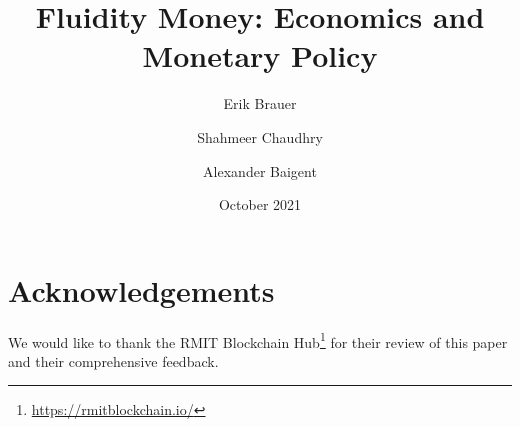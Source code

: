 \documentclass{article}
\title{\vspace{-1.0cm}Fluidity Money: Economics and Monetary Policy}
\author[]{Erik Brauer}
\author[]{Shahmeer Chaudhry}
\author[]{Alexander Baigent}
\affil[]{Fluidity Money}
\date{October 2021}
\theoremstyle{definition}
\begin{document}
\maketitle





\newpage



\newpage



\newpage



\newpage



\newpage



\newpage

\section*{Acknowledgements}

We would like to thank the RMIT Blockchain Hub\footnote{\url{https://rmitblockchain.io/}} for their review of this paper and their comprehensive feedback.

\newpage

\printbibliography
\end{document}
